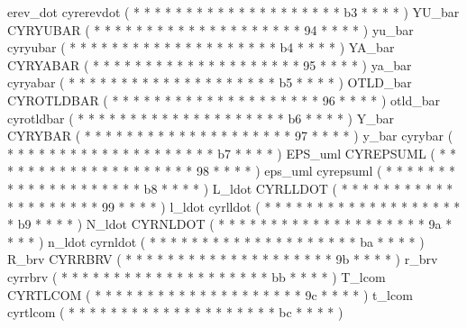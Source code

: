 \makecod erev_dot     cyrerevdot        ( *  *       *  *   *  *  *  *     *  *  *  *  *     *  *  *  *     *  *  *     b3  *  *    *  *   )
\makeCOD YU_bar       CYRYUBAR          ( *  *       *  *   *  *  *  *     *  *  *  *  *     *  *  *  *     *  *  *     94  *  *    *  *   )
\makecod yu_bar       cyryubar          ( *  *       *  *   *  *  *  *     *  *  *  *  *     *  *  *  *     *  *  *     b4  *  *    *  *   )
\makeCOD YA_bar       CYRYABAR          ( *  *       *  *   *  *  *  *     *  *  *  *  *     *  *  *  *     *  *  *     95  *  *    *  *   )
\makecod ya_bar       cyryabar          ( *  *       *  *   *  *  *  *     *  *  *  *  *     *  *  *  *     *  *  *     b5  *  *    *  *   )
\makeCOD OTLD_bar     CYROTLDBAR        ( *  *       *  *   *  *  *  *     *  *  *  *  *     *  *  *  *     *  *  *     96  *  *    *  *   )
\makecod otld_bar     cyrotldbar        ( *  *       *  *   *  *  *  *     *  *  *  *  *     *  *  *  *     *  *  *     b6  *  *    *  *   )
\makeCOD Y_bar        CYRYBAR           ( *  *       *  *   *  *  *  *     *  *  *  *  *     *  *  *  *     *  *  *     97  *  *    *  *   )
\makecod y_bar        cyrybar           ( *  *       *  *   *  *  *  *     *  *  *  *  *     *  *  *  *     *  *  *     b7  *  *    *  *   )
\makeCOD EPS_uml      CYREPSUML         ( *  *       *  *   *  *  *  *     *  *  *  *  *     *  *  *  *     *  *  *     98  *  *    *  *   )
\makecod eps_uml      cyrepsuml         ( *  *       *  *   *  *  *  *     *  *  *  *  *     *  *  *  *     *  *  *     b8  *  *    *  *   )
\makeCOD L_ldot       CYRLLDOT          ( *  *       *  *   *  *  *  *     *  *  *  *  *     *  *  *  *     *  *  *     99  *  *    *  *   )
\makecod l_ldot       cyrlldot          ( *  *       *  *   *  *  *  *     *  *  *  *  *     *  *  *  *     *  *  *     b9  *  *    *  *   )
\makeCOD N_ldot       CYRNLDOT          ( *  *       *  *   *  *  *  *     *  *  *  *  *     *  *  *  *     *  *  *     9a  *  *    *  *   )
\makecod n_ldot       cyrnldot          ( *  *       *  *   *  *  *  *     *  *  *  *  *     *  *  *  *     *  *  *     ba  *  *    *  *   )
\makeCOD R_brv        CYRRBRV           ( *  *       *  *   *  *  *  *     *  *  *  *  *     *  *  *  *     *  *  *     9b  *  *    *  *   )
\makecod r_brv        cyrrbrv           ( *  *       *  *   *  *  *  *     *  *  *  *  *     *  *  *  *     *  *  *     bb  *  *    *  *   )
\makeCOD T_lcom       CYRTLCOM          ( *  *       *  *   *  *  *  *     *  *  *  *  *     *  *  *  *     *  *  *     9c  *  *    *  *   )
\makecod t_lcom       cyrtlcom          ( *  *       *  *   *  *  *  *     *  *  *  *  *     *  *  *  *     *  *  *     bc  *  *    *  *   )
